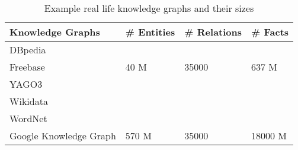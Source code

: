 \begin{table}[t]
\centering

\label{tab:kgs}
\begin{tabular}{@{}llll@{}}
\toprule
Knowledge Graphs       & \# Entities & \# Relations & \# Facts \\ \midrule
DBpedia                &             &              &          \\
Freebase			   &     40 M    &      35000   &    637 M \\
YAGO3                  &             &              &          \\
Wikidata               &             &              &          \\
WordNet                &             &              &          \\
Google Knowledge Graph &      570 M  &       35000  &   18000 M\\ \bottomrule
\end{tabular}
\caption{Example real life knowledge graphs and their sizes}

\end{table}